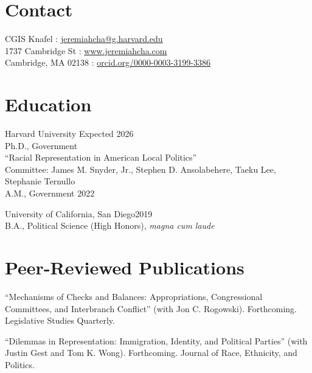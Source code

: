 \documentclass[margin, line]{res}
\begin{document}
\begin{resume}

\section{Contact}
CGIS Knafel \hfill \Letter: \href{mailto:jeremiahcha@g.harvard.edu}{jeremiahcha@g.harvard.edu}\\
1737 Cambridge St \hfill \Mundus: \href{httsp://www.jeremiahcha.com}{www.jeremiahcha.com}\\
Cambridge, MA 02138 \hfill \Mundus: \href{https://orcid.org/0000-0003-3199-3386}{orcid.org/0000-0003-3199-3386}

\section{Education}
Harvard University \hfill Expected 2026\\
\hspace*{5mm} Ph.D., Government\\
\hspace*{10mm} {\footnotesize ``Racial Representation in American Local Politics''}\\
\hspace*{10mm} {\footnotesize Committee: James M. Snyder, Jr., Stephen D. Ansolabehere, Taeku Lee, Stephanie Ternullo}\\
\hspace*{5mm} A.M., Government \hfill 2022

University of California, San Diego\hfill 2019\\
\hspace*{5mm} B.A., Political Science (High Honors), \textit{magna cum laude} 

\section{Peer-Reviewed Publications}
\begin{etaremune}
	\item ``Mechanisms of Checks and Balances: Appropriations, Congressional Committees, and Interbranch Conflict'' (with Jon C. Rogowski). Forthcoming. Legislative Studies Quarterly.
	\item ``Dilemmas in Representation: Immigration, Identity, and Political Parties'' (with Justin Gest and Tom K. Wong). Forthcoming. Journal of Race, Ethnicity, and Politics. 
\end{etaremune}


\end{resume}
\end{document}
